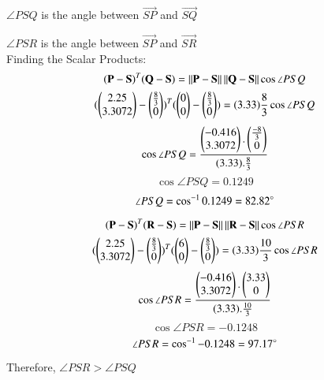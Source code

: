 $\angle{PSQ}$ is the angle between $\vec{SP}$ and $\vec{SQ}$

$\angle{PSR}$ is the angle between $\vec{SP}$ and $\vec{SR}$
\\
Finding the Scalar Products:
$$(\mathbf{P} - \mathbf{S})^T(\mathbf{Q} - \mathbf{S}) = \left\lVert\mathbf{P} - \mathbf{S}\right\rVert\left\lVert\mathbf{Q} - \mathbf{S}\right\rVert\cos{\angle{PSQ}}$$
$$(\begin{pmatrix}2.25\\3.3072\end{pmatrix} - \begin{pmatrix}\frac{8}{3}\\0\end{pmatrix})^T(\begin{pmatrix}0\\0\end{pmatrix} - \begin{pmatrix}\frac{8}{3}\\0\end{pmatrix}) = (3.33)\frac{8}{3}\cos{\angle{PSQ}}$$
$$\cos{\angle{PSQ}} = \frac{\begin{pmatrix}-0.416\\3.3072\end{pmatrix}.\begin{pmatrix}\frac{-8}{3}\\0\end{pmatrix}}{(3.33).\frac{8}{3}}$$
$$\cos{\angle{PSQ}} = 0.1249$$
$$\angle{PSQ} = \cos^{-1}{0.1249} = 82.82\degree$$

$$(\mathbf{P} - \mathbf{S})^T(\mathbf{R} - \mathbf{S}) = \left\lVert\mathbf{P} - \mathbf{S}\right\rVert\left\lVert\mathbf{R} - \mathbf{S}\right\rVert\cos{\angle{PSR}}$$
$$(\begin{pmatrix}2.25\\3.3072\end{pmatrix} - \begin{pmatrix}\frac{8}{3}\\0\end{pmatrix})^T(\begin{pmatrix}6\\0\end{pmatrix} - \begin{pmatrix}\frac{8}{3}\\0\end{pmatrix}) = (3.33)\frac{10}{3}\cos{\angle{PSR}}$$
$$\cos{\angle{PSR}} = \frac{\begin{pmatrix}-0.416\\3.3072\end{pmatrix}.\begin{pmatrix}3.33\\0\end{pmatrix}}{(3.33).\frac{10}{3}}$$
$$\cos{\angle{PSR}} = -0.1248$$
$$\angle{PSR} = \cos^{-1}{-0.1248} = 97.17\degree$$

Therefore, $\angle{PSR} > \angle{PSQ}$
